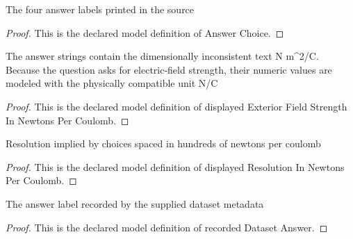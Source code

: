 \begin{definition}
  \label{def:physics:phyx-mini-0849:phyxminiproblems-problemphyxmini0849-answerchoice}
  The four answer labels printed in the source
\end{definition}
\begin{proof}
  This is the declared model definition of Answer Choice.
\end{proof}
\begin{definition}
  \label{def:physics:phyx-mini-0849:phyxminiproblems-problemphyxmini0849-displayedexteriorfieldstrengthinnewtonspercoulomb}
  The answer strings contain the dimensionally inconsistent text N m\textasciicircum{}2/C. Because the question asks for electric-field strength, their numeric values are modeled with the physically compatible unit N/C
\end{definition}
\begin{proof}
  This is the declared model definition of displayed Exterior Field Strength In Newtons Per Coulomb.
\end{proof}
\begin{definition}
  \label{def:physics:phyx-mini-0849:phyxminiproblems-problemphyxmini0849-displayedresolutioninnewtonspercoulomb}
  Resolution implied by choices spaced in hundreds of newtons per coulomb
\end{definition}
\begin{proof}
  This is the declared model definition of displayed Resolution In Newtons Per Coulomb.
\end{proof}
\begin{definition}
  \label{def:physics:phyx-mini-0849:phyxminiproblems-problemphyxmini0849-recordeddatasetanswer}
  The answer label recorded by the supplied dataset metadata
\end{definition}
\begin{proof}
  This is the declared model definition of recorded Dataset Answer.
\end{proof}
